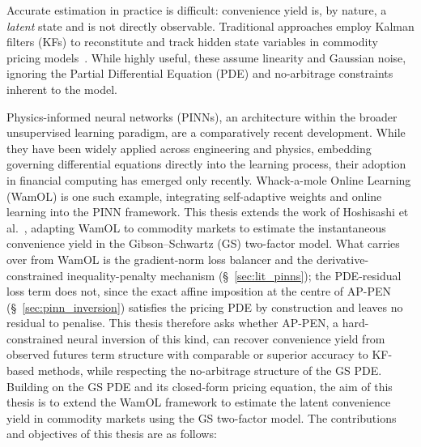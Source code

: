 \documentclass[11pt, a4paper]{article}
\begin{document}
Accurate estimation in practice is difficult: convenience yield is, by nature, a \textit{latent} state and is not directly observable. Traditional approaches employ Kalman filters (KFs) to reconstitute and track hidden state variables in commodity pricing models~\cite{Schwartz1997TheHedging}. While highly useful, these assume linearity and Gaussian noise, ignoring the Partial Differential Equation (PDE) and no-arbitrage constraints inherent to the model.

Physics-informed neural networks (PINNs), an architecture within the broader unsupervised learning paradigm, are a comparatively recent development. While they have been widely applied across engineering and physics, embedding governing differential equations directly into the learning process, their adoption in financial computing has emerged only recently. Whack-a-mole Online Learning (WamOL) is one such example, integrating self-adaptive weights and online learning into the PINN framework. This thesis extends the work of Hoshisashi et al.~\cite{Hoshisashi2024Whack-a-moleSurface}, adapting WamOL to commodity markets to estimate the instantaneous convenience yield in the Gibson–Schwartz (GS) two-factor model. What carries over from WamOL is the gradient-norm loss balancer and the derivative-constrained inequality-penalty mechanism (\S~\ref{sec:lit_pinns}); the PDE-residual loss term does not, since the exact affine imposition at the centre of AP-PEN (\S~\ref{sec:pinn_inversion}) satisfies the pricing PDE by construction and leaves no residual to penalise.
This thesis therefore asks whether AP-PEN, a hard-constrained neural inversion of this kind, can recover convenience yield from observed futures term structure with comparable or superior accuracy to KF-based methods, while respecting the no-arbitrage structure of the GS PDE. Building on the GS PDE and its closed-form pricing equation, the aim of this thesis is to extend the WamOL framework to estimate the latent convenience yield in commodity markets using the GS two-factor model. The contributions and objectives of this thesis are as follows:
\end{document}
